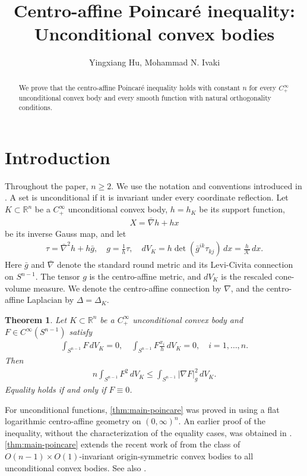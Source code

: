 \documentclass[12pt]{amsart}
\title[Centro-affine Poincar\'e inequality]{Centro-affine Poincar\'e inequality:\\ Unconditional convex bodies}
\author[Y. Hu, M. N. Ivaki]{Yingxiang Hu, Mohammad N. Ivaki}
\newcommand{\R}{\mathbb{R}}
\newcommand{\Sn}{S^{n-1}}
\newcommand{\abs}[1]{\left|#1\right|}
\newcommand{\eq}[1]{\begin{equation}\begin{alignedat}{2}#1\end{alignedat}\end{equation}}
\theoremstyle{plain}
\newtheorem{theorem}{Theorem}[section]
\theoremstyle{definition}
\theoremstyle{remark}
\numberwithin{equation}{section}
\begin{document}
\begin{abstract}
We prove that the centro-affine Poincar\'e inequality holds with constant $n$ for every $C^{\infty}_+$ unconditional convex body and every smooth function with natural orthogonality conditions.
\end{abstract}

\maketitle

\section{Introduction}

Throughout the paper, $n\geq 2$. We use the notation and conventions
introduced in \cite{HI26}. A set is unconditional if it is invariant under every coordinate reflection. Let $K\subset\R^n$ be a $C^{\infty}_+$ unconditional convex body, $h=h_K$ be its support function,
\eq{
X=\bar{\nabla}h+hx
}
be its inverse Gauss map, and let
\eq{
\tau=\bar{\nabla}^2h+h\bar{g},\quad g=\frac{1}{h}\tau,\quad dV_K=h\det(\bar{g}^{ik}\tau_{kj})\,dx=\frac{h}{\mathcal{K}}\,dx.
}
Here $\bar{g}$ and $\bar{\nabla}$ denote the standard round metric and its Levi-Civita connection on $\Sn$. The tensor $g$ is the centro-affine metric, and $dV_K$ is the rescaled cone-volume measure. We denote the centro-affine connection by $\nabla$, and the centro-affine Laplacian by $\Delta=\Delta_K$.

\begin{theorem}\label{thm:main-poincare}
Let $K\subset\R^n$ be a $C^{\infty}_+$ unconditional convex body and $F\in C^{\infty}(\Sn)$ satisfy
\eq{
\int_{\Sn}F\, dV_K=0,\quad \int_{\Sn}F\frac{x_i}{h}\,dV_K=0,\quad i=1,\ldots,n.
}
Then
\eq{\label{eq:main-even-poincare}
n\int_{\Sn}F^2\,dV_K\le \int_{\Sn}\abs{\nabla F}_g^2\,dV_K.
}
Equality holds if and only if $F\equiv 0$.
\end{theorem}

For unconditional functions, \autoref{thm:main-poincare} was proved in \cite[Thm. 8.12]{HI26} using a flat logarithmic centro-affine geometry on $(0,\infty)^n$. An earlier proof of the inequality, without the characterization of the equality cases, was obtained in \cite{KM22}. \autoref{thm:main-poincare} extends the recent work of \cite{Iff26} from the class of $O(n-1)\times O(1)$-invariant origin-symmetric convex bodies to all unconditional convex bodies. See also \cite{IM23a,Han23}.
\end{document}

